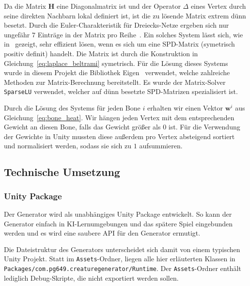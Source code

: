 Da die Matrix $\textbf{H}$ eine Diagonalmatrix ist und der Operator $\Delta$ eines Vertex durch seine direkten Nachbarn lokal definiert ist, ist die zu lösende Matrix extrem dünn besetzt. Durch die Euler-Charakteristik für Dreiecks-Netze ergeben sich nur ungefähr $7$ Einträge in der Matrix pro Reihe~\cite{spd_solver_paper}. Ein solches System lässt sich, wie in~\cite{spd_solver_paper} gezeigt, sehr effizient lösen, wenn es sich um eine SPD-Matrix (symetrisch positiv definit) handelt. Die Matrix ist durch die Konstruktion in Gleichung~\ref{eq:laplace_beltrami} symetrisch. Für die Lösung dieses Systems wurde in diesem Projekt die Bibliothek Eigen~\cite{eigen} verwendet, welche zahlreiche Methoden zur Matrix-Berechnung bereitstellt. Es wurde der Matrix-Solver \texttt{SparseLU} verwendet, welcher auf dünn besetzte SPD-Matrizen spezialisiert ist.

Durch die Lösung des Systems für jeden Bone $i$ erhalten wir einen Vektor $\textbf{w}^i$ aus Gleichung~\ref{eq:bone_heat}. Wir hängen jeden Vertex mit dem entsprechenden Gewicht an diesen Bone, falls das Gewicht größer als $0$ ist. Für die Verwendung der Gewichte in Unity mussten diese außerdem pro Vertex absteigend sortiert und normalisiert werden, sodass sie sich zu $1$ aufsummieren.






\subsection{Technische Umsetzung}

\subsubsection{Unity Package}
Der Generator wird als unabhängiges Unity Package entwickelt.
So kann der Generator einfach in KI-Lernumgebungen und das spätere Spiel eingebunden werden und es wird eine saubere API für den Generator ermutigt.

Die Dateistruktur des Generators unterscheidet sich damit von einem typischen Unity Projekt. Statt im \texttt{Assets}-Ordner, liegen alle hier erläuterten Klassen in \linebreak\texttt{Packages/com.pg649.creaturegenerator/Runtime}.
Der \texttt{Assets}-Ordner enthält lediglich Debug-Skripte, die nicht exportiert werden sollen.

